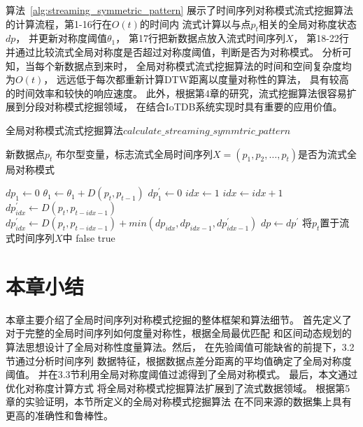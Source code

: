算法~\ref{alg:streaming_symmetric_pattern}
展示了时间序列对称模式流式挖掘算法
的计算流程，第1-16行在$O(t)$的时间内
流式计算以与点$p_t$相关的全局对称度状态$dp$，
并更新对称度阈值$\theta_1$，
第17行把新数据点放入流式时间序列$X$，
第18-22行
并通过比较流式全局对称度是否超过对称度阈值，判断是否为对称模式。
分析可知，当每个新数据点到来时，
全局对称模式流式挖掘算法的时间和空间复杂度均为$O(t)$，
远远低于每次都重新计算DTW距离以度量对称性的算法，
具有较高的时间效率和较快的响应速度。
此外，根据第4章的研究，流式挖掘算法很容易扩展到分段对称模式挖掘领域，
在结合IoTDB系统实现时具有重要的应用价值。

\renewcommand{\algorithmicrequire}{\textbf{输入：}\unskip}
\renewcommand{\algorithmicensure}{\textbf{输出：}\unskip}

\begin{algorithm}
  \caption{全局对称模式流式挖掘算法$calculate\_streaming\_symmtric\_pattern$}
  \label{alg:streaming_symmetric_pattern}
  \small
  \begin{algorithmic}
    \REQUIRE 新数据点$p_t$
    \ENSURE 布尔型变量，标志流式全局时间序列$X=\left(p_{1},p_{2},…,p_t \right)$是否为流式全局对称模式

      \STATE $dp_{1} \leftarrow 0$
    \ELSE
      \STATE $\theta_1 \leftarrow \theta_1+D\left(p_{t}, p_{t-1}\right)$
      \STATE $dp_1^{\prime} \leftarrow 0$
      \STATE $ idx \leftarrow 1$
        \STATE $ idx \leftarrow idx+1$
          \STATE $dp_{idx}^{\prime} \leftarrow D\left(p_{t}, p_{t-idx-1}\right)$
        \ELSE
          \STATE $dp_{idx}^{\prime} \leftarrow D\left(p_{t}, p_{t-idx-1}\right)+min(dp_{idx},dp_{idx-1},dp_{idx-1}^{\prime})$
        \ENDIF
      \ENDWHILE
      \STATE $ dp \leftarrow dp^{\prime}$
    \ENDIF
    \STATE 将$p_t$置于流式时间序列$X$中
      \RETURN false
    \ELSE
      \RETURN true
    \ENDIF
  \end{algorithmic}
\end{algorithm}

\section{本章小结}
本章主要介绍了全局时间序列对称模式挖掘的整体框架和算法细节。
首先定义了对于完整的全局时间序列如何度量对称性，根据全局最优匹配
和区间动态规划的算法思想设计了全局对称性度量算法。然后，
在先验阈值可能缺省的前提下，3.2节通过分析时间序列
数据特征，根据数据点差分距离的平均值确定了全局对称度阈值。
并在3.3节利用全局对称度阈值过滤得到了全局对称模式。
最后，本文通过优化对称度计算方式
将全局对称模式挖掘算法扩展到了流式数据领域。
根据第5章的实验证明，本节所定义的全局对称模式挖掘算法
在不同来源的数据集上具有更高的准确性和鲁棒性。